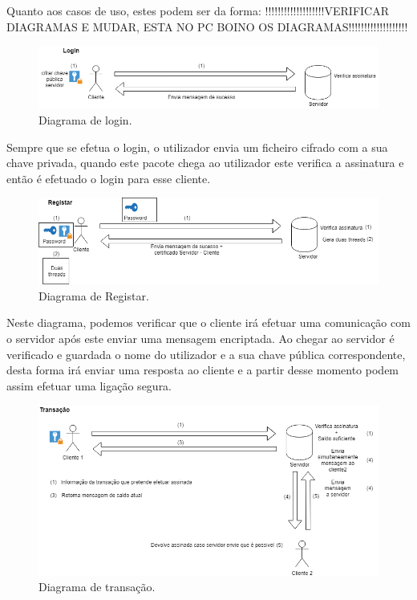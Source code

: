 Quanto aos casos de uso, estes podem ser da forma:
!!!!!!!!!!!!!!!!!!!VERIFICAR DIAGRAMAS E MUDAR, ESTA NO PC BOINO OS DIAGRAMAS!!!!!!!!!!!!!!!!!!!


\begin{figure}[H]
\centering
\includegraphics[width=.7\textwidth]{imagens/login.png}
\caption{Diagrama de login.}
\label{fig7}
\end{figure}


Sempre que se efetua o login, o utilizador envia um ficheiro cifrado com a sua chave privada, quando este pacote chega ao utilizador este verifica a assinatura e então é efetuado o login para esse cliente.

\begin{figure}[H]
\centering
\includegraphics[width=.7\textwidth]{imagens/Registar.png}
\caption{Diagrama de Registar.}
\label{fig7}
\end{figure}


Neste diagrama, podemos verificar que o cliente irá efetuar uma comunicação com o servidor após este enviar uma mensagem encriptada. Ao chegar ao servidor é verificado e guardada o nome do utilizador e a sua chave pública correspondente, desta forma irá enviar uma resposta ao cliente e a partir desse momento podem assim efetuar uma ligação segura.

\begin{figure}[H]
\centering
\includegraphics[width=.7\textwidth]{imagens/Transação.png}
\caption{Diagrama de transação.}
\label{fig7}
\end{figure}


